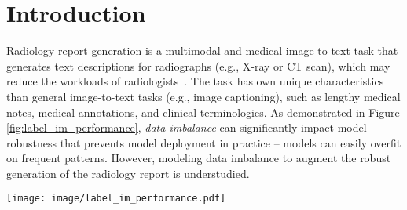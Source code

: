 \documentclass[sn-mathphys-num]{sn-jnl}%
\theoremstyle{thmstyleone}%
\theoremstyle{thmstyletwo}%
\theoremstyle{thmstylethree}%
\begin{document}


\maketitle

\section{Introduction}\label{sec1}

Radiology report generation is a multimodal and medical image-to-text task that generates  text descriptions for radiographs (e.g., X-ray or CT scan), which may reduce the workloads of radiologists~\cite{jing2018automatic, jing2019show}. 
The task has own unique characteristics than general image-to-text tasks (e.g., image captioning), such as lengthy medical notes, medical annotations, and clinical terminologies. 
As demonstrated in Figure \ref{fig:label_im_performance}, \textit{data imbalance} can significantly impact model robustness that prevents model deployment in practice -- models can easily overfit on frequent patterns.
However, modeling data imbalance to augment the robust generation of the radiology report is understudied.

\begin{figure*}[t]
\centering 
\texttt{[image: image/label\_im\_performance.pdf]}
\caption{State-of-the-art model performance on normal and abnormal entries by BLEU-4 (left two) and low- and high-frequent tokens by F1 scores (right two). }
\label{fig:label_im_performance}
\end{figure*}
\end{document}
